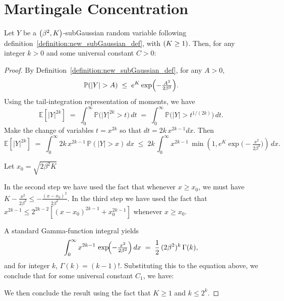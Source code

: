 \section{Martingale Concentration}
\label{appendix:martingale_concentration}

\begin{lemma}\label{lemma:subgauss_moment_bound}
    Let $Y$ be a $\left(\beta^2,K\right)$-subGaussian random variable following definition~\ref{definition:new_subGaussian_def}, with $\left(K \geq 1\right)$. Then, for any integer $k > 0$ and some universal constant $C > 0$:
\end{lemma}
\begin{proof}
By Definition~\ref{definition:new_subGaussian_def}, for any \(A>0\),
\[
  \mathbb{P}(|Y|> A)\;\le\; e^K \exp\Bigl(-\tfrac{A^2}{2\beta^2}\Bigr).
\]
Using the tail-integration representation of moments, we have
\[
  \mathbb{E}[|Y|^{2k}]
  \;=\;\int_{0}^{\infty} \mathbb{P}\bigl(|Y|^{2k} > t\bigr)\,dt
  \;=\;\int_{0}^{\infty} \mathbb{P}\bigl(|Y| > t^{1/(2k)}\bigr)\,dt.
\]
Make the change of variables \( t = x^{2k}\) so that \(dt = 2k\,x^{2k-1}dx\).  Then
\[
  \mathbb{E}[|Y|^{2k}]
  \;=\;\int_{0}^{\infty} 2k\,x^{2k-1}\,\mathbb{P}(|Y| > x)\,dx
  \;\le\;
  2k\,\int_{0}^{\infty} x^{2k-1}\,\min(1,e^K\exp\!\bigl(-\tfrac{x^2}{2\beta^2}\bigr))\,dx.
\]

Let $x_0 = \sqrt{2\beta^2K}$


In the second step we have used the fact that whenever $x \geq x_0$, we must have $K-\frac{x^2}{2\beta^2} \leq -\frac{(x-x_0)^2}{2\beta^2}$. In the third step we have used the fact that $x^{2k-1} \leq 2^{2k-2}[(x-x_0)^{2k-1} + x_0^{2k-1}]$ whenever $x \geq x_0$.

A standard Gamma-function integral yields
\[
  \int_{0}^{\infty} x^{2k-1}\,\exp\!\Bigl(-\tfrac{x^2}{2\beta^2}\Bigr)\,dx
  \;=\;\frac12\,(2\beta^2)^k\,\Gamma(k),
\]
and for integer \(k\), \(\Gamma(k)= (k-1)!\).  Substituting this to the equation above, we conclude that for some universal constant $C_1$, we have:

We then conclude the result using the fact that $K \geq 1$ and $k \leq 2^k$.

\end{proof}



